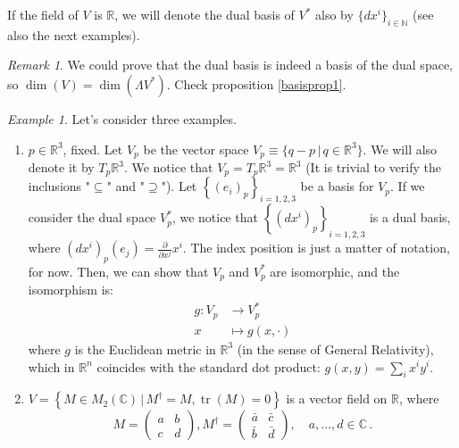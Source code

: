 \documentclass[a4paper,11pt,titlepage, article, oneside]{memoir}
\numberwithin{equation}{section}
\theoremstyle{definition}
\theoremstyle{remark}
\newtheorem{remark}[theorem]{Remark}
\newtheorem{example}[theorem]{Example}
\DeclareMathOperator{\tr}{tr}
\newcommand{\rfield}{\mathbb{R}}
\begin{document}
If the field of $V$ is $\rfield$, we will denote the dual basis of $V^*$ also by $\{dx^i\}_{i \in \mathbb{N}}$ (see also the next examples).

\begin{remarkbox}\begin{remark}
We could prove that the dual basis is indeed a basis of the dual space, so $\dim(V) = \dim(\Lambda V^*)$. Check proposition \ref{basisprop1}.
\end{remark}\end{remarkbox}

\begin{tcolorbox}\begin{example}
  Let's consider three examples.
  \begin{enumerate}
    \item $p \in \rfield^3$, fixed. Let $V_p$ be the vector space $V_p \equiv \{ q-p \,|\, q \in \rfield^3 \}$. We will also denote it by $T_p\rfield^3$. We notice that $V_p = T_p\rfield^3 = \rfield^3$ (It is trivial to verify the inclusions "$\subseteq$" and "$\supseteq$"). Let $\left \{ (e_i)_p \right \}_{i=1,2,3}$ be a basis for $V_p$. If we consider the dual space $V_p^*$, we notice that $\left \{(dx^i)_p \right\}_{i=1,2,3}$ is a dual basis, where $(dx^i)_p (e_j) = \frac{\partial}{\partial x^j} x^i$. The index position is just a matter of notation, for now. Then, we can show that $V_p$ and $V_p^*$ are isomorphic, and the isomorphism is:
    \begin{align} \label{dualisomorph}
      g \colon V_p &\rightarrow V_p^* \\
      x &\mapsto g(x, \cdot) \nonumber
    \end{align}
    where $g$ is the Euclidean metric in $\rfield^3$ (in the sense of General Relativity), which in $\rfield^n$ coincides with the standard dot product: $g(x, y) = \sum_i x^i y^i$.
    \item $V = \left \{ M \in M_2(\mathbb{C}) \, | \, M^{\dagger} = M, \tr(M) = 0 \right \}$ is a vector field on $\rfield$, where
    $$M= \left ( \begin{matrix}
    a &b \\
    c &d
  \end{matrix}\right ), M^{\dagger}= \left (\begin{matrix}
    \bar a &\bar c \\
    \bar b &\bar d
    \end{matrix} \right ), \quad a, \ldots, d \in \mathbb{C} \, .$$


\end{enumerate}
\end{example}
\end{tcolorbox}
\end{document}
